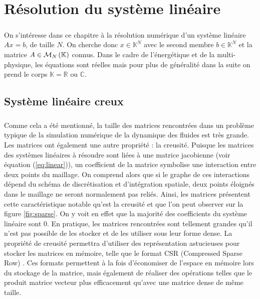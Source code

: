 \chapter{Résolution du système linéaire}

\paragraph{}
On s'intéresse dans ce chapitre à la résolution numérique d'un système linéaire $Ax = b$, de taille $N$.
On cherche donc $x\in\mathbb{K}^N$ avec le second membre $b\in\mathbb{K}^N$ et la matrice $A\in\mathcal{M}_{N}\left(\mathbb{K}\right)$ connus.
Dans le cadre de l'énergétique et de la multi-physique, les équations sont réelles mais pour plus de généralité dans la suite on prend le corps $\mathbb{K} = \mathbb{R}\textrm{ ou }\mathbb{C}$.


\section{Système linéaire creux}

	\paragraph{}
	Comme cela a été mentionné, la taille des matrices rencontrées dans un problème typique de la simulation numérique de la dynamique des fluides est très grande.
	Les matrices ont également une autre propriété : la creusité.
	Puisque les matrices des systèmes linéaires à résoudre sont liées à une matrice jacobienne (voir équation (\ref{eq:linear})), un coefficient de la matrice symbolise une interaction entre deux points du maillage.
	On comprend alors que si le graphe de ces interactions dépend du schéma de discrétisation et d'intégration spatiale, deux points éloignés dans le maillage ne seront normalement pas reliés.
	Ainsi, les matrices présentent cette caractéristique notable qu'est la creusité et que l'on peut observer sur la figure \ref{fig:sparse}.
	On y voit en effet que la majorité des coefficients du système linéaire sont 0.
	En pratique, les matrices rencontrées sont tellement grandes qu'il n'est pas possible de les stocker et de les utiliser sous leur forme dense.
	La propriété de creusité permettra d'utiliser des représentation astucieuses pour stocker les matrices en mémoire, telle que le format CSR (Compressed Sparse Row) \cite{Saad2003}.
	Ces formats permettent à la fois d'économiser de l'espace en mémoire lors du stockage de la matrice, mais également de réaliser des opérations telles que le produit matrice vecteur plus efficacement qu'avec une matrice dense de même taille.

